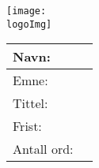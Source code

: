 \begin{center}
	\texttt{[image: \\logoImg]}
	
	\vspace{.5cm}
	\def\arraystretch{1.3}
	\begin{tabular}{ m{} | m{} }
		\toprule
		Navn: & \myName  \\
		\midrule
		Emne: & \mySubject \\
		\midrule
		Tittel: & \essayTitle \\
		\midrule
		Frist: & \dueDate \\
		\midrule
		Antall ord: &  \wordCount \\ 	
		\bottomrule
	\end{tabular}
	\vspace{.5cm}
\end{center}

